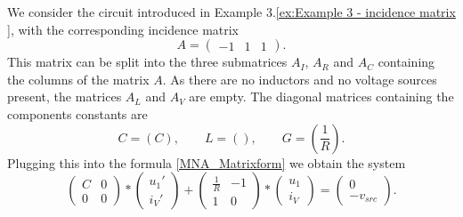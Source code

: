 \begin{example3}
	\label{ex:Example 3 - MNA}
	We consider the circuit introduced in Example 3.\ref{ex:Example 3 - incidence matrix }, with the corresponding incidence matrix
	\begin{displaymath}
		A = 
		\left(
		\begin{matrix}
			-1 & 1 & 1
		\end{matrix}
		\right).
	\end{displaymath} 
	This matrix can be split into the three submatrices $A_I$, $A_R$ and $A_C$ containing the columns of the matrix $A$. As there are no inductors and no voltage sources present, the matrices $A_L$ and $A_V$ are empty. The diagonal matrices containing the components constants are
	\begin{displaymath}
		C = (C), \qquad L = (), \qquad G = (\frac{1}{R}).
	\end{displaymath}
	Plugging this into the formula \eqref{MNA_Matrixform} we obtain the system
	\begin{equation}
		\label{eq:ex3 MNA}
		\begin{pmatrix}
			C & 0 \\
			0 & 0 
		\end{pmatrix}
		*
		\begin{pmatrix}
			u_1' \\
			i_V'
		\end{pmatrix}
		+
		\begin{pmatrix}
			\frac{1}{R} & -1 \\
			1 & 0
		\end{pmatrix}
		*
		\begin{pmatrix}
			u_1 \\
			i_V
		\end{pmatrix}
		=
		\begin{pmatrix}
			0 \\
			-v_{src}
		\end{pmatrix}.
	\end{equation}
\end{example3}

